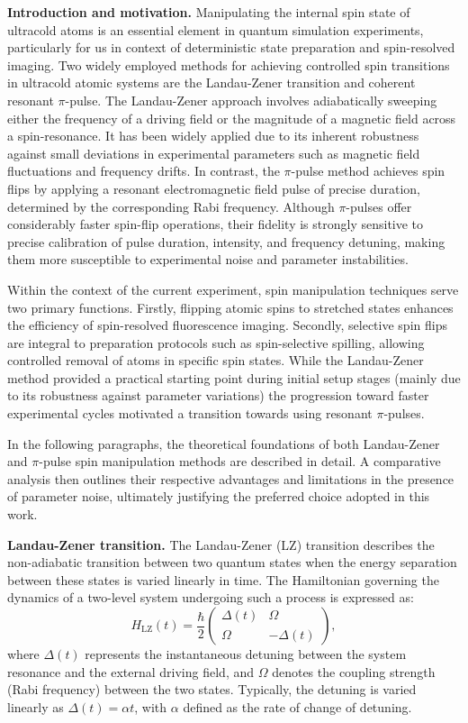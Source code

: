 \textbf{Introduction and motivation.}
Manipulating the internal spin state of ultracold atoms is an essential element in quantum simulation experiments, particularly for us in context of deterministic state preparation and spin-resolved imaging.
Two widely employed methods for achieving controlled spin transitions in ultracold atomic systems are the Landau-Zener transition and coherent resonant $\pi$-pulse. The Landau-Zener approach involves adiabatically sweeping either the frequency of a driving field or the magnitude of a magnetic field across a spin-resonance. It has been widely applied due to its inherent robustness against small deviations in experimental parameters such as magnetic field fluctuations and frequency drifts. In contrast, the $\pi$-pulse method achieves spin flips by applying a resonant electromagnetic field pulse of precise duration, determined by the corresponding Rabi frequency. Although $\pi$-pulses offer considerably faster spin-flip operations, their fidelity is strongly sensitive to precise calibration of pulse duration, intensity, and frequency detuning, making them more susceptible to experimental noise and parameter instabilities.

Within the context of the current experiment, spin manipulation techniques serve two primary functions. Firstly, flipping atomic spins to stretched states enhances the efficiency of spin-resolved fluorescence imaging. Secondly, selective spin flips are integral to preparation protocols such as spin-selective spilling, allowing controlled removal of atoms in specific spin states. While the Landau-Zener method provided a practical starting point during initial setup stages (mainly due to its robustness against parameter variations) the progression toward faster experimental cycles motivated a transition towards using resonant $\pi$-pulses.

In the following paragraphs, the theoretical foundations of both Landau-Zener and $\pi$-pulse spin manipulation methods are described in detail. A comparative analysis then outlines their respective advantages and limitations in the presence of parameter noise, ultimately justifying the preferred choice adopted in this work.

\textbf{Landau-Zener transition.}
The Landau-Zener (LZ) transition \cite{landau_zur_1932,zener_non-adiabatic_1997} describes the non-adiabatic transition between two quantum states when the energy separation between these states is varied linearly in time. The Hamiltonian governing the dynamics of a two-level system undergoing such a process is expressed as:
\begin{equation}
H_{\text{LZ}}(t) = \frac{\hbar}{2}
\begin{pmatrix}
\Delta(t) & \Omega \\
\Omega & -\Delta(t)
\end{pmatrix},
\label{eq:LZ_Hamiltonian}
\end{equation}
where $\Delta(t)$ represents the instantaneous detuning between the system resonance and the external driving field, and $\Omega$ denotes the coupling strength (Rabi frequency) between the two states. Typically, the detuning is varied linearly as $\Delta(t) = \alpha t$, with $\alpha$ defined as the rate of change of detuning.

